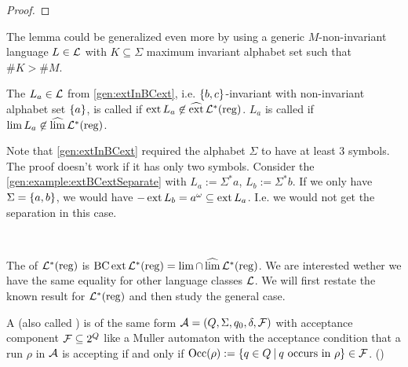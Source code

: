 \begin{theorem}
\begin{proof}
%
\end{proof}
\end{theorem}

The lemma could be generalized even more by using a generic $M$-non-invariant language $L \in \mathcal{L}$ with $K \subseteq \Sigma$ maximum invariant alphabet set such that $\#K > \#M$.

\begin{mydef}
The $L_a \in \mathcal{L}$ from \cref{gen:extInBCext}, i.e. $\Set{b,c}$-invariant with non-invariant alphabet set $\Set{a}$, is called  if $\operatorname{ext} L_a \not\in \operatorname{\widehat{ext}} \mathcal{L}^*(\textup{\textrm{reg}})$. $L_a$ is called  if $\lim L_a \not\in \operatorname{\widehat{lim}} \mathcal{L}^*(\textup{\textrm{reg}})$.
\end{mydef}

Note that \cref{gen:extInBCext} required the alphabet $\Sigma$ to have at least 3 symbols. The proof doesn't work if it has only two symbols. Consider the \cref{gen:example:extBCextSeparate} with $L_a := \Sigma^*a$, $L_b := \Sigma^*b$. If we only have $\Sigma=\Set{a,b}$, we would have $-\operatorname{ext} L_b = a^\omega \subseteq \operatorname{ext} L_a$. I.e. we would not get the separation in this case.


\

The  of $\mathcal{L}^*(\textup{\textrm{reg}})$ is $\operatorname{BC} \operatorname{ext} \mathcal{L}^*(\textup{\textrm{reg}}) = \lim \cap \operatorname{\widehat{lim}} \mathcal{L}^*(\textup{\textrm{reg}})$. We are interested wether we have the same equality for other language classes $\mathcal{L}$. We will first restate the known result for $\mathcal{L}^*(\textup{\textrm{reg}})$ and then study the general case.

\begin{mydef}
\label{def:staiger-wagner}
A  (also called ) is of the same form $\mathcal{A} = (Q,\Sigma,q_0,\delta,\mathcal{F})$ with acceptance component $\mathcal{F} \subseteq 2^Q$ like a Muller automaton with the acceptance condition that a run $\rho$ in $\mathcal{A}$ is accepting if and only if $\Occ(\rho) := \Set{q \in Q}{\text{$q$ occurs in $\rho$}} \in \F$.  (\cite[Def.61, p.43]{InfCompR101})
\end{mydef}

